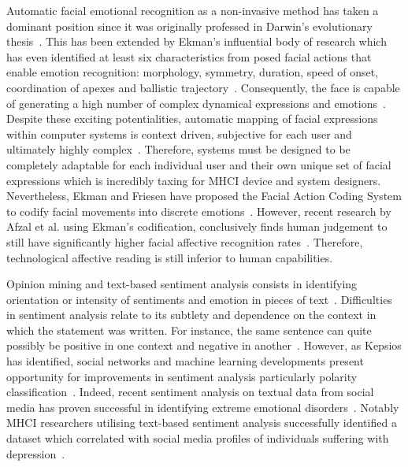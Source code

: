 \documentclass{sigchi}
\begin{document}
Automatic facial emotional recognition as a non-invasive method has taken a dominant position since it was originally professed in Darwin’s evolutionary thesis~\cite{hess2009darwin}. This has been extended by Ekman’s influential body of research which has even identified at least six characteristics from posed facial actions that enable emotion recognition: morphology, symmetry, duration, speed of onset, coordination of apexes and ballistic trajectory~\cite{ekman1992facial, keltner2003facial}. Consequently, the face is capable of generating a high number of complex dynamical expressions and emotions~\cite{donato1999classifying}. Despite these exciting potentialities, automatic mapping of facial expressions within computer systems is context driven, subjective for each user and ultimately highly complex~\cite{bartlett1999measuring, tian2005facial}. Therefore, systems must be designed to be completely adaptable for each individual user and their own unique set of facial expressions which is incredibly taxing for MHCI device and system designers. Nevertheless, Ekman and Friesen have proposed the Facial Action Coding System to codify facial movements into discrete emotions~\cite{cohn2007observer}. However, recent research by Afzal et al. using Ekman’s codification, conclusively finds human judgement to still have significantly higher facial affective recognition rates~\cite{afzal2009perception}. Therefore, technological affective reading is still inferior to human capabilities.  

Opinion mining and text-based sentiment analysis consists in identifying orientation or intensity of sentiments and emotion in pieces of text~\cite{nicolaou2012output}. Difficulties in sentiment analysis relate to its subtlety and dependence on the context in which the statement was written. For instance, the same sentence can quite possibly be positive in one context and negative in another~\cite{marechal2019survey}. However, as Kepsios has identified, social networks and machine learning developments present opportunity for improvements in sentiment analysis particularly polarity classification~\cite{trigeorgis2016adieu}. Indeed, recent sentiment analysis on textual data from social media has proven successful in identifying extreme emotional disorders~\cite{sharma2019automated}. Notably MHCI researchers utilising text-based sentiment analysis successfully identified a dataset which correlated with social media profiles of individuals suffering with depression~\cite{de2013predicting}.
\end{document}
